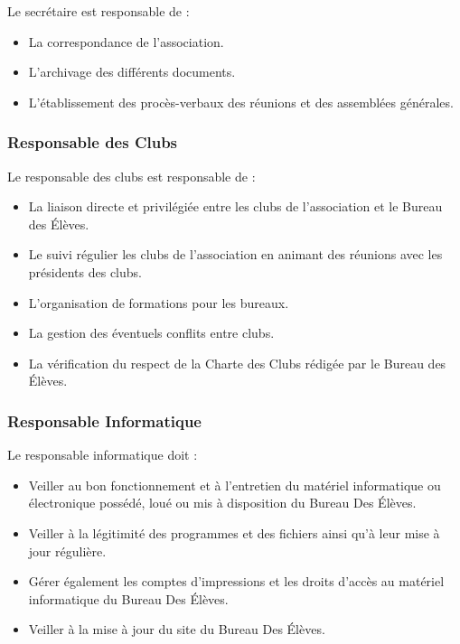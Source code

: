 \documentclass{article} %
\begin{document}
				Le secrétaire est responsable de :
				\begin{itemize}
					\item La correspondance de l’association.
					\item L’archivage des différents documents.
					\item L’établissement des procès-verbaux des réunions et des
						assemblées générales.
				\end{itemize}

			\subsubsection{Responsable des Clubs}

				Le responsable des clubs est responsable de :
				\begin{itemize}
					\item La liaison directe et privilégiée entre les clubs de
						l’association et le Bureau des Élèves.
					\item Le suivi régulier les clubs de l’association en
						animant des réunions avec les
						présidents des clubs.
					\item L’organisation de formations pour les bureaux.
					\item La gestion des éventuels conflits entre clubs.
					\item La vérification du respect de la Charte des Clubs
						rédigée par le Bureau des Élèves.
				\end{itemize}

			\subsubsection{Responsable Informatique}
				
				Le responsable informatique doit :
				\begin{itemize}
					\item Veiller au bon fonctionnement et à l’entretien du
						matériel informatique ou électronique possédé, loué ou
						mis à disposition du Bureau Des Élèves.
					\item Veiller à la légitimité des programmes et des fichiers
						ainsi qu’à leur mise à jour régulière.
					\item Gérer également les comptes d’impressions et les
						droits d’accès au matériel informatique du Bureau Des
						Élèves.
					\item Veiller à la mise à jour du site du Bureau Des Élèves.
				\end{itemize}
\end{document}
